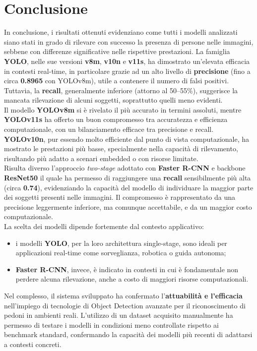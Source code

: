 \documentclass[12pt]{article}
\begin{document}
\section{Conclusione}

In conclusione, i risultati ottenuti evidenziano come tutti i modelli analizzati siano stati in grado di rilevare con successo la presenza di persone nelle immagini, sebbene con differenze significative nelle rispettive prestazioni. La famiglia \textbf{YOLO}, nelle sue versioni \textbf{v8m}, \textbf{v10n} e \textbf{v11s}, ha dimostrato un’elevata efficacia in contesti real-time, in particolare grazie ad un alto livello di \textbf{precisione} (fino a circa \textbf{0.8965} con YOLOv8m), utile a contenere il numero di falsi positivi. Tuttavia, la \textbf{recall}, generalmente inferiore (attorno al 50--55\%), suggerisce la mancata rilevazione di alcuni soggetti, soprattutto quelli meno evidenti.\\
Il modello \textbf{YOLOv8m} si è rivelato il più accurato in termini assoluti, mentre \textbf{YOLOv11s} ha offerto un buon compromesso tra accuratezza e efficienza computazionale, con un bilanciamento efficace tra precisione e recall. \textbf{YOLOv10n}, pur essendo molto efficiente dal punto di vista computazionale, ha mostrato le prestazioni più basse, specialmente nella capacità di rilevamento, risultando più adatto a scenari embedded o con risorse limitate.\\
Risulta diverso l’approccio \textit{two-stage} adottato con \textbf{Faster R-CNN} e backbone \textbf{ResNet50} il quale ha permesso di raggiungere una \textbf{recall} sensibilmente più alta (circa \textbf{0.74}), evidenziando la capacità del modello di individuare la maggior parte dei soggetti presenti nelle immagini. Il compromesso è rappresentato da una precisione leggermente inferiore, ma comunque accettabile, e da un maggior costo computazionale.\\
La scelta dei modelli dipende fortemente dal contesto applicativo:
\begin{itemize}
    \item i modelli \textbf{YOLO}, per la loro architettura single-stage, sono ideali per applicazioni real-time come sorveglianza, robotica o guida autonoma;
    \item \textbf{Faster R-CNN}, invece, è indicato in contesti in cui è fondamentale non perdere alcuna rilevazione, anche a costo di maggiori risorse computazionali.
\end{itemize}
Nel complesso, il sistema sviluppato ha confermato l'\textbf{attuabilità e l'efficacia} nell'impiego di tecnologie di Object Detection avanzate per il riconoscimento di pedoni in ambienti reali. L’utilizzo di un dataset acquisito manualmente ha permesso di testare i modelli in condizioni meno controllate rispetto ai benchmark standard, confermando la capacità dei modelli più recenti di adattarsi a contesti concreti.\vspace{1em}\\
\end{document}
